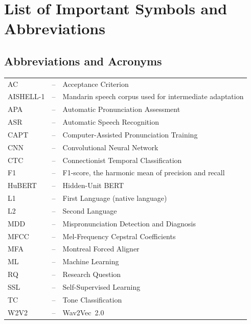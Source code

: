 \chapter*{List of Important Symbols and Abbreviations}

\section*{Abbreviations and Acronyms}
\noindent
\begin{tabular}{l c l}
  AC     & -- & Acceptance Criterion \\
  AISHELL-1 & -- & Mandarin speech corpus used for intermediate adaptation \\
  APA    & -- & Automatic Pronunciation Assessment \\
  ASR    & -- & Automatic Speech Recognition \\
  CAPT   & -- & Computer-Assisted Pronunciation Training \\
  CNN    & -- & Convolutional Neural Network \\
  CTC    & -- & Connectionist Temporal Classification \\
  F1     & -- & F1-score, the harmonic mean of precision and recall \\
  HuBERT & -- & Hidden-Unit BERT \\
  L1     & -- & First Language (native language) \\
  L2     & -- & Second Language \\
  MDD    & -- & Mispronunciation Detection and Diagnosis \\
  MFCC   & -- & Mel-Frequency Cepstral Coefficients \\
  MFA    & -- & Montreal Forced Aligner \\
  ML     & -- & Machine Learning \\
  RQ     & -- & Research Question \\
  SSL    & -- & Self-Supervised Learning \\
  TC     & -- & Tone Classification \\
  W2V2   & -- & Wav2Vec~2.0 \\
\end{tabular}

